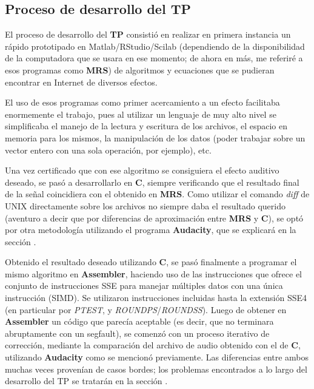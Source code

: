 \subsection{Proceso de desarrollo del TP}
\label{subsec:intro-desarrollo}
El proceso de desarrollo del \textbf{TP} consistió en realizar en primera instancia un rápido prototipado en Matlab/RStudio/Scilab (dependiendo de la disponibilidad de la computadora que se usara en ese momento; de ahora en más, me referiré a esos programas como \textbf{MRS}) de algoritmos y ecuaciones que se pudieran encontrar en Internet de diversos efectos. 

El uso de esos programas como primer acercamiento a un efecto facilitaba enormemente el trabajo, pues al utilizar un lenguaje de muy alto nivel se simplificaba el manejo de la lectura y escritura de los archivos, el espacio en memoria para los mismos, la manipulación de los datos (poder trabajar sobre un vector entero con una sola operación, por ejemplo), etc.\vspace{\baselineskip}

Una vez certificado que con ese algoritmo se consiguiera el efecto auditivo deseado, se pasó a desarrollarlo en \textbf{C}, siempre verificando que el resultado final de la señal coincidiera con el obtenido en \textbf{MRS}. Como utilizar el comando \textit{diff} de UNIX directamente sobre los archivos no siempre daba el resultado querido (aventuro a decir que por diferencias de aproximación entre \textbf{MRS} y \textbf{C}), se optó por otra metodología utilizando el programa \textbf{Audacity}, que se explicará en la sección .\vspace{\baselineskip}

Obtenido el resultado deseado utilizando \textbf{C}, se pasó finalmente a programar el mismo algoritmo en \textbf{Assembler}, haciendo uso de las instrucciones que ofrece el conjunto de instrucciones SSE para manejar múltiples datos con una única instrucción (SIMD). Se utilizaron instrucciones incluidas hasta la extensión SSE4 (en particular por \textit{PTEST}, y \textit{ROUNDPS}/\textit{ROUNDSS}). 
Luego de obtener en \textbf{Assembler} un código que parecía aceptable (es decir, que no terminara abruptamente con un segfault), se comenzó con un proceso iterativo de corrección, mediante la comparación del archivo de audio obtenido con el de \textbf{C}, utilizando \textbf{Audacity} como se mencionó previamente. Las diferencias entre ambos muchas veces provenían de casos bordes; los problemas encontrados a lo largo del desarrollo del TP se tratarán en la sección .\vspace{\baselineskip}

